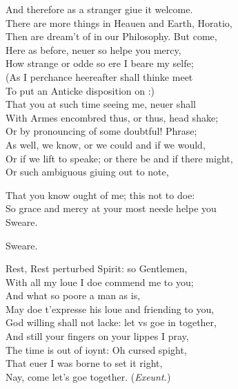 \documentclass[a5paper,DIV=calc,11pt]{scrbook}
\newcommand{\updatemarks}{\markboth{Act \Roman{act}}{Scene \Roman{act}--\Roman{scene}}}
\begin{document}
\begin{drama*}
    \hamspeaks And therefore as a stranger giue it welcome.\\
    There are more things in Heauen and Earth, Horatio,\\
    Then are dream't of in our Philosophy. But come,\\
    Here as before, neuer so helpe you mercy,\\
    How strange or odde so ere I beare my selfe;\\
    (As I perchance heereafter shall thinke meet\\
    To put an Anticke disposition on :)\\
    That you at such time seeing me, neuer shall\\
    With Armes encombred thus, or thus, head shake;\\
    Or by pronouncing of some doubtful! Phrase;\\
    As well, we know, or we could and if we would,\\
    Or if we lift to speake; or there be and if there might,\\
    Or such ambiguous giuing out to note,
    
    That you know ought of me; this not to doe:\\
    So grace and mercy at your most neede helpe you\\
    Sweare.
    
    \ghospeaks Sweare.
    
    \hamspeaks Rest, Rest perturbed Spirit: so Gentlemen,\\
    With all my loue I doe commend me to you;\\
    And what so poore a man as \ham is,\\
    May doe t'expresse his loue and friending to you,\\
    God willing shall not lacke: let vs goe in together,\\
    And still your fingers on your lippes I pray,\\
    The time is out of ioynt: Oh cursed spight,\\
    That euer I was borne to set it right,\\
    Nay, come let's goe together. \hfill(\textit{Exeunt.})
\end{drama*}

\act

\scene

\updatemarks

\end{document}
